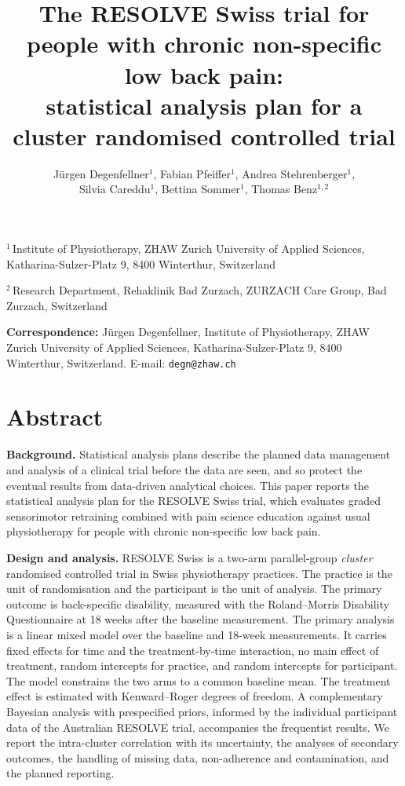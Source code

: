 \documentclass[11pt,a4paper]{article}
\title{\Large\bfseries The RESOLVE Swiss trial for people with chronic
non-specific low back pain:\\
statistical analysis plan for a cluster randomised controlled trial}
\author{Jürgen Degenfellner$^{1}$, Fabian Pfeiffer$^{1}$, Andrea Stehrenberger$^{1}$,\\
Silvia Careddu$^{1}$, Bettina Sommer$^{1}$, Thomas Benz$^{1,2}$}
\date{}
\begin{document}
\linenumbers
\maketitle

{\small
\noindent $^{1}$\,Institute of Physiotherapy, ZHAW Zurich University of
Applied Sciences, Katharina-Sulzer-Platz 9, 8400 Winterthur, Switzerland

\noindent $^{2}$\,Research Department, Rehaklinik Bad Zurzach, ZURZACH Care
Group, Bad Zurzach, Switzerland

\noindent\textbf{Correspondence:} Jürgen Degenfellner, Institute of
Physiotherapy, ZHAW Zurich University of Applied Sciences,
Katharina-Sulzer-Platz 9, 8400 Winterthur, Switzerland.
E-mail: \texttt{degn@zhaw.ch}
}

\vspace{0.4em}

\section*{Abstract}

\textbf{Background.} Statistical analysis plans describe the planned data
management and analysis of a clinical trial before the data are seen, and so
protect the eventual results from data-driven analytical choices. This paper
reports the statistical analysis plan for the RESOLVE Swiss trial, which
evaluates graded sensorimotor retraining combined with pain science
education against usual physiotherapy for people with chronic non-specific
low back pain.

\textbf{Design and analysis.} RESOLVE Swiss is a two-arm parallel-group
\emph{cluster} randomised controlled trial in Swiss physiotherapy practices.
The practice is the unit of randomisation and the participant is the unit of
analysis. The primary outcome is back-specific disability, measured with the
Roland--Morris Disability Questionnaire at 18 weeks after the baseline
measurement. The
primary analysis is a linear mixed model over the baseline and 18-week
measurements. It carries fixed effects for time and the treatment-by-time
interaction, no main effect of treatment, random intercepts for practice, and
random intercepts for participant. The model constrains the two arms to a common baseline
mean. The treatment effect
is estimated with Kenward--Roger degrees of freedom. A complementary Bayesian analysis with
prespecified priors, informed by the individual participant data of the
Australian RESOLVE trial, accompanies the frequentist results. We report the intra-cluster correlation with its
uncertainty, the analyses of secondary outcomes, the handling of missing data,
non-adherence and contamination, and the planned reporting.
\end{document}
